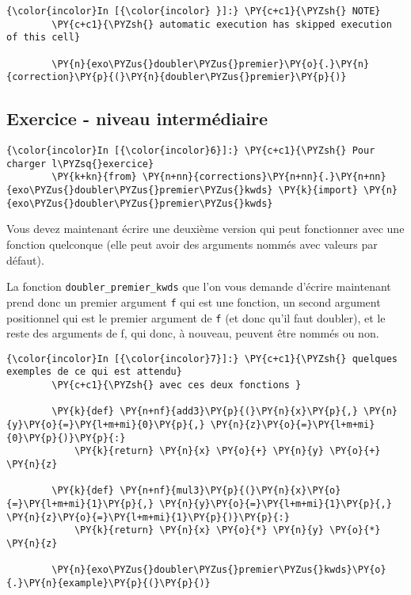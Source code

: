     \begin{Verbatim}[commandchars=\\\{\}]
{\color{incolor}In [{\color{incolor} }]:} \PY{c+c1}{\PYZsh{} NOTE}
        \PY{c+c1}{\PYZsh{} automatic execution has skipped execution of this cell}
        
        \PY{n}{exo\PYZus{}doubler\PYZus{}premier}\PY{o}{.}\PY{n}{correction}\PY{p}{(}\PY{n}{doubler\PYZus{}premier}\PY{p}{)}
\end{Verbatim}


    \hypertarget{exercice---niveau-intermuxe9diaire}{%
\subsection{Exercice - niveau
intermédiaire}\label{exercice---niveau-intermuxe9diaire}}

    \begin{Verbatim}[commandchars=\\\{\}]
{\color{incolor}In [{\color{incolor}6}]:} \PY{c+c1}{\PYZsh{} Pour charger l\PYZsq{}exercice}
        \PY{k+kn}{from} \PY{n+nn}{corrections}\PY{n+nn}{.}\PY{n+nn}{exo\PYZus{}doubler\PYZus{}premier\PYZus{}kwds} \PY{k}{import} \PY{n}{exo\PYZus{}doubler\PYZus{}premier\PYZus{}kwds}
\end{Verbatim}


    Vous devez maintenant écrire une deuxième version qui peut fonctionner
avec une fonction quelconque (elle peut avoir des arguments nommés avec
valeurs par défaut).

La fonction \texttt{doubler\_premier\_kwds} que l'on vous demande
d'écrire maintenant prend donc un premier argument \texttt{f} qui est
une fonction, un second argument positionnel qui est le premier argument
de \texttt{f} (et donc qu'il faut doubler), et le reste des arguments de
f, qui donc, à nouveau, peuvent être nommés ou non.

    \begin{Verbatim}[commandchars=\\\{\}]
{\color{incolor}In [{\color{incolor}7}]:} \PY{c+c1}{\PYZsh{} quelques exemples de ce qui est attendu}
        \PY{c+c1}{\PYZsh{} avec ces deux fonctions }
        
        \PY{k}{def} \PY{n+nf}{add3}\PY{p}{(}\PY{n}{x}\PY{p}{,} \PY{n}{y}\PY{o}{=}\PY{l+m+mi}{0}\PY{p}{,} \PY{n}{z}\PY{o}{=}\PY{l+m+mi}{0}\PY{p}{)}\PY{p}{:}
            \PY{k}{return} \PY{n}{x} \PY{o}{+} \PY{n}{y} \PY{o}{+} \PY{n}{z}
        
        \PY{k}{def} \PY{n+nf}{mul3}\PY{p}{(}\PY{n}{x}\PY{o}{=}\PY{l+m+mi}{1}\PY{p}{,} \PY{n}{y}\PY{o}{=}\PY{l+m+mi}{1}\PY{p}{,} \PY{n}{z}\PY{o}{=}\PY{l+m+mi}{1}\PY{p}{)}\PY{p}{:}
            \PY{k}{return} \PY{n}{x} \PY{o}{*} \PY{n}{y} \PY{o}{*} \PY{n}{z}
        
        \PY{n}{exo\PYZus{}doubler\PYZus{}premier\PYZus{}kwds}\PY{o}{.}\PY{n}{example}\PY{p}{(}\PY{p}{)}
\end{Verbatim}


